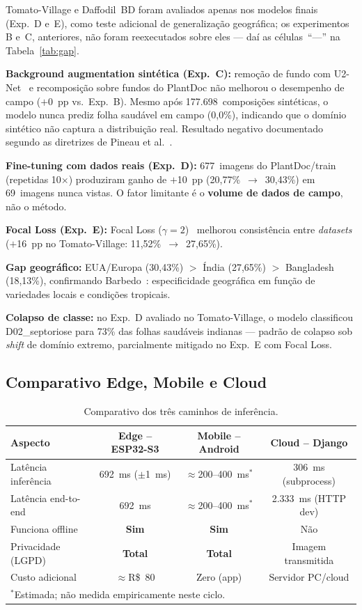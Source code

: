 \documentclass[12pt]{article}
\begin{document}
Tomato-Village e Daffodil~BD foram avaliados apenas nos modelos finais (Exp.~D e~E),
como teste adicional de generalização geográfica; os experimentos B e~C, anteriores,
não foram reexecutados sobre eles --- daí as células~``---'' na Tabela~\ref{tab:gap}.

\textbf{Background augmentation sintética (Exp.~C):} remoção de fundo com
U2-Net~\cite{qin2020} e recomposição sobre fundos do PlantDoc não melhorou o
desempenho de campo ($+$0~pp vs.\ Exp.~B). Mesmo após 177.698~composições
sintéticas, o modelo nunca prediz folha saudável em campo (0,0\%), indicando que
o domínio sintético não captura a distribuição real. Resultado negativo
documentado segundo as diretrizes de Pineau et al.~\cite{pineau2021}.

\textbf{Fine-tuning com dados reais (Exp.~D):} 677~imagens do PlantDoc/train
(repetidas 10$\times$) produziram ganho de $+$10~pp (20,77\%~$\to$~30,43\%)
em 69~imagens nunca vistas. O fator limitante é o \textbf{volume de dados de
campo}, não o método.

\textbf{Focal Loss (Exp.~E):} Focal Loss ($\gamma=2$)~\cite{lin2017} melhorou
consistência entre \textit{datasets} ($+$16~pp no Tomato-Village: 11,52\%~$\to$~27,65\%).

\textbf{Gap geográfico:} EUA/Europa (30,43\%) $>$ Índia (27,65\%) $>$ Bangladesh
(18,13\%), confirmando Barbedo~\cite{barbedo2019}: especificidade geográfica em
função de variedades locais e condições tropicais.

\textbf{Colapso de classe:} no Exp.~D avaliado no Tomato-Village, o modelo
classificou D02\_septoriose para 73\% das folhas saudáveis indianas --- padrão de
colapso sob \textit{shift} de domínio extremo, parcialmente mitigado no Exp.~E com
Focal Loss.

\subsection{Comparativo Edge, Mobile e Cloud}

\begin{table}[ht]
\centering
\caption{Comparativo dos três caminhos de inferência.}
\label{tab:edge}
\begin{tabular}{@{}lccc@{}}
\toprule
\textbf{Aspecto} & \textbf{Edge -- ESP32-S3} & \textbf{Mobile -- Android} & \textbf{Cloud -- Django} \\
\midrule
Latência inferência & 692~ms ($\pm$1~ms)   & $\approx$200--400~ms$^*$ & 306~ms (subprocess) \\
Latência end-to-end & 692~ms               & $\approx$200--400~ms$^*$ & 2.333~ms (HTTP dev) \\
Funciona offline    & \textbf{Sim}         & \textbf{Sim}             & Não \\
Privacidade (LGPD)  & \textbf{Total}       & \textbf{Total}           & Imagem transmitida \\
Custo adicional     & $\approx$R\$~80      & Zero (app)               & Servidor PC/cloud \\
\bottomrule
\multicolumn{4}{l}{\footnotesize $^*$Estimada; não medida empiricamente neste ciclo.}
\end{tabular}
\end{table}
\end{document}
